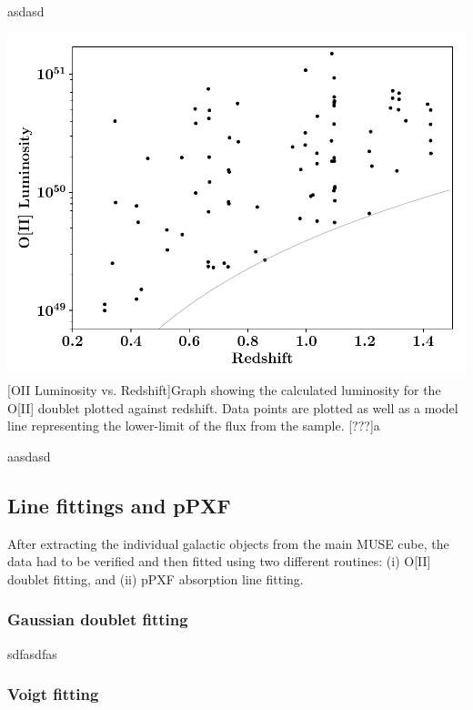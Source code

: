 \documentclass[12pt, twocolumn]{revtex4}    %
\begin{document}
\twocolumngrid

asdasd

\begin{center}
\includegraphics[width=1.0\linewidth]{data/o_ii_luminosity_vs_redshift}
[OII Luminosity vs. Redshift]{Graph showing the calculated luminosity for the O[II] doublet plotted against redshift. Data points are plotted as well as a model line representing the lower-limit of the flux from the sample. [???]a}
\label{fig:oiiluminosity_redshift}
\end{center}

aasdasd

\subsection{Line fittings and pPXF} 

After extracting the individual galactic objects from the main MUSE cube, the data had to be verified and then fitted using two different routines: (i) O[II] doublet fitting, and (ii) pPXF absorption line fitting. 

\subsubsection{Gaussian doublet fitting}

sdfasdfas

\subsubsection{Voigt fitting}
\end{document}

